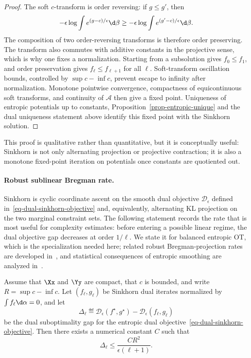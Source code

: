 \begin{proof}
	The soft $c$-transform is order reversing: if $g\leq g'$, then
	\[
		-\epsilon\log\int e^{(g-c)/\epsilon}\d\beta
		\geq
		-\epsilon\log\int e^{(g'-c)/\epsilon}\d\beta.
	\]
	The composition of two order-reversing transforms is therefore order preserving. The transform also commutes with additive constants in the projective sense, which is why one fixes a normalization. Starting from a subsolution gives $f_0\leq f_1$, and order preservation gives $f_\ell\leq f_{\ell+1}$ for all $\ell$. Soft-transform oscillation bounds, controlled by $\sup c-\inf c$, prevent escape to infinity after normalization. Monotone pointwise convergence, compactness of equicontinuous soft transforms, and continuity of $\mathcal A$ then give a fixed point. Uniqueness of entropic potentials up to constants, Proposition~\ref{prop-entropic-unique} and the dual uniqueness statement above identify this fixed point with the Sinkhorn solution.
\end{proof}

This proof is qualitative rather than quantitative, but it is conceptually useful: Sinkhorn is not only alternating projection or projective contraction; it is also a monotone fixed-point iteration on potentials once constants are quotiented out.


\paragraph{Robust sublinear Bregman rate.}

	Sinkhorn is cyclic coordinate ascent on the smooth dual objective $\mathcal D_\epsilon$ defined in~\eqref{eq-dual-sinkhorn-objective} and, equivalently, alternating KL projection on the two marginal constraint sets. The following statement records the rate that is most useful for complexity estimates: before entering a possible linear regime, the dual objective gap decreases at order $1/\ell$. We state it for balanced entropic OT, which is the specialization needed here; related robust Bregman-projection rates are developed in~\cite{peyre2026robust,altschuler2017near,pmlr-v80-dvurechensky18a}, and statistical consequences of entropic smoothing are analyzed in~\cite{genevay2018sample,bigot2017central}.

\begin{prop}\label{prop-sinkhorn-dual-rate}
	Assume that $\Xx$ and $\Yy$ are compact, that $c$ is bounded, and write $R=\sup c-\inf c$. Let $(f_\ell,g_\ell)$ be Sinkhorn dual iterates normalized by $\int f_\ell\d\alpha=0$, and let
	\[
		\Delta_\ell
		\eqdef
		\mathcal D_\epsilon(f^\star,g^\star)-\mathcal D_\epsilon(f_\ell,g_\ell)
	\]
	be the dual suboptimality gap for the entropic dual objective~\eqref{eq-dual-sinkhorn-objective}. Then there exists a numerical constant $C$ such that
	\[
		\Delta_\ell \leq \frac{C R^2}{\epsilon(\ell+1)}.
	\]
\end{prop}

